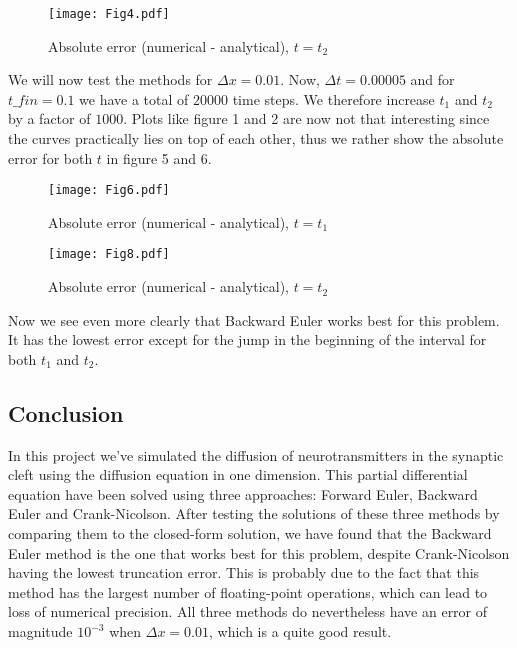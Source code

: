 \documentclass[a4paper,12pt, english]{article}
\begin{document}
\begin{figure}[!h]
\centering
\texttt{[image: Fig4.pdf]}
\caption{Absolute error (numerical - analytical), $t = t_2$}
\end{figure} 

We will now test the methods for $\Delta x = 0.01$. Now, $\Delta t = 0.00005$ and for 
$t\_ fin = 0.1$ we have a total of $20 000$ time steps. We therefore increase $t_1$ and $t_2$ by a factor of $1000$. Plots like figure 1 and 2 are now not that interesting since the curves practically lies on top of each other, thus we rather show the absolute error for both $t$ in figure 5 and 6. 

\begin{figure}[!h]
\centering
\texttt{[image: Fig6.pdf]}
\caption{Absolute error (numerical - analytical), $t = t_1$}
\end{figure} 

\begin{figure}[!h]
\centering
\texttt{[image: Fig8.pdf]}
\caption{Absolute error (numerical - analytical), $t = t_2$}
\end{figure} 

Now we see even more clearly that Backward Euler works best for this problem. It has the lowest error except for the jump in the beginning of the interval for both $t_1$ and $t_2$. 


\subsection*{Conclusion}
In this project we've simulated the diffusion of neurotransmitters in the synaptic cleft using the diffusion equation in one dimension. This partial differential equation have been solved using three approaches: Forward Euler, Backward Euler and Crank-Nicolson. After testing the solutions of these three methods by comparing them to the closed-form solution, we have found that the Backward Euler method is the one that works best for this problem, despite Crank-Nicolson having the lowest truncation error. This is probably due to the fact that this method has the largest number of floating-point operations, which can lead to loss of numerical precision. All three methods do nevertheless have an error of magnitude $10^{-3}$ when $\Delta x = 0.01$, which is a quite good result. 
\end{document}
